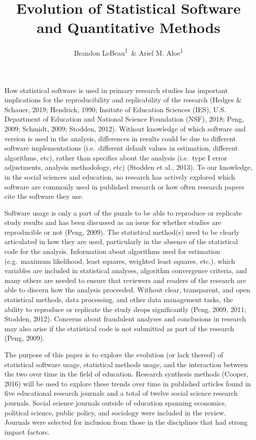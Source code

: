 \documentclass[
  english,
  ,man]{apa6}
\affiliation{
\vspace{0.5cm}
\textsuperscript{1} University of Iowa}
\title{Evolution of Statistical Software and Quantitative Methods}
\author{Brandon LeBeau\textsuperscript{1}~\& Ariel M. Aloe\textsuperscript{1}}
\date{}
\begin{document}
\maketitle

How statistical software is used in primary research studies has important implications for the reproducibility and replicability of the research (Hedges \& Schauer, 2019; Hendrick, 1990; Insitute of Education Sciences (IES), U.S. Department of Education and National Science Foundation (NSF), 2018; Peng, 2009; Schmidt, 2009; Stodden, 2012). Without knowledge of which software and version is used in the analysis, differences in results could be due to different software implementations (i.e.~different default values in estimation, different algorithms, etc), rather than specifics about the analysis (i.e.~type I error adjustments, analysis methodology, etc) (Stodden et al., 2013). To our knowledge, in the social sciences and education, no research has actively explored which software are commonly used in published research or how often research papers cite the software they use.

Software usage is only a part of the puzzle to be able to reproduce or replicate study results and has been discussed as an issue for whether studies are reproducible or not (Peng, 2009). The statistical method(s) need to be clearly articulated in how they are used, particularly in the absence of the statistical code for the analysis. Information about algorithms used for estimation (e.g.~maximum likelihood, least squares, weighted least squares, etc.), which variables are included in statistical analyses, algorithm convergence criteria, and many others are needed to ensure that reviewers and readers of the research are able to discern how the analysis proceeded. Without clear, transparent, and open statistical methods, data processing, and other data management tasks, the ability to reproduce or replicate the study drops significantly (Peng, 2009, 2011; Stodden, 2012). Concerns about fraudulent analyses and conclusions in research may also arise if the statistical code is not submitted as part of the research (Peng, 2009).

The purpose of this paper is to explore the evolution (or lack thereof) of statistical software usage, statistical methods usage, and the interaction between the two over time in the field of education. Research synthesis methods (Cooper, 2016) will be used to explore these trends over time in published articles found in five educational research journals and a total of twelve social science research journals. Social science journals outside of education spanning economics, political science, public policy, and sociology were included in the review. Journals were selected for inclusion from those in the disciplines that had strong impact factors.
\end{document}
